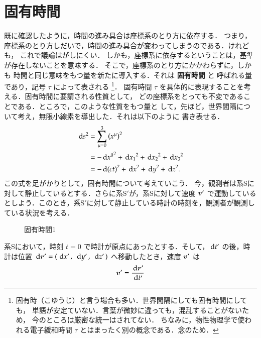 \section{固有時間}
    既に確認したように，時間の進み具合は座標系のとり方に依存する．
    つまり，座標系のとり方しだいで，時間の進み具合が変わってしまうのである．けれども，
    これで議論はがしにくい．
    しかも，座標系に依存するということは，基準が存在しないことを意味する．
    そこで，座標系のとり方にかかわらずに，しかも
    時間と同じ意味をもつ量を新たに導入する．それは \textbf{固有時間} と
    呼ばれる量であり，記号 $\tau$ によって表される
        \footnote{
            固有時（こゆうじ）と言う場合も多い．世界間隔にしても固有時間にしても，
            単語が安定ていない．言葉が微妙に違っても，混乱することがないため，
            今のところは厳密な統一はされてない．
            ちなみに，物性物理学で使われる電子緩和時間 $\tau$ とはまったく別の概念である．念のため．
        }．
    固有時間 $\tau$ を具体的に表現することを考える．固有時間に要請される性質として，
    どの座標系をとっても不変であることである．ところで，このような性質をもつ量と
    して，先ほど，世界間隔について考え，無限小線素を導出した．それは以下のように
    書き表せる．
     \begin{align*}
         \,\mathrm{d} s^{2} &= \sum_{\mu=0}^{3} \left({{x}^{\mu}}\right)^{2} \\
                   &= -\,\mathrm{d} {x^{0}}^{2} + {\,\mathrm{d} x_{1}}^{2} + {\,\mathrm{d} x_{2}}^{2} + {\,\mathrm{d} x_{3}}^{2} \\
                   &= -{\,\mathrm{d} (ct)}^{2} + {\,\mathrm{d} x}^{2} + {\,\mathrm{d} y}^{2} + {\,\mathrm{d} z}^{2}.
     \end{align*}
    この式を足がかりとして，固有時間について考えていこう．
    今，観測者は系Sに対して静止しているとする．さらに系S$'$が，系Sに対して速度 $\boldsymbol{v} '$ で運動しているとしよう．このとき，系S$'$に対して静止している時計の時刻を，観測者が観測している状況を考える．
            \begin{figure}[hbt]
                \begin{center}
                    \caption{固有時間1}
                    \label{fig:koyuuji1}
                \end{center}
            \end{figure}
    系Sにおいて，時刻 $t=0$ で時計が原点にあったとする．そして，$\,\mathrm{d} t'$ の後，時計は位置 $\,\mathrm{d} \boldsymbol{r} ' = (\,\,\mathrm{d} x'\,,\,\,\,\mathrm{d} y'\,,\,\,\,\mathrm{d} z'\,)$ へ移動したとき，速度 $\boldsymbol{v} '$ は
        \begin{align}
            \boldsymbol{v} '   =  \frac{\,\mathrm{d} \boldsymbol{r} '}{\,\mathrm{d} t'}
        \end{align}
